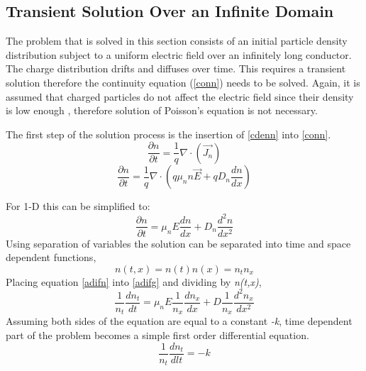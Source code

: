 \begin{doublespace}
\clearpage
\subsection{Transient Solution Over an Infinite Domain}

The problem that is solved in this section consists of an initial particle density distribution subject to a uniform electric field over an infinitely long conductor. The charge distribution drifts and diffuses over time. This requires a transient solution  therefore the continuity equation (\ref{conn}) needs to be solved. Again, it is assumed that charged particles do not affect the electric field since their density is low enough , therefore solution of Poisson's equation is not necessary. 

The first step of the solution process is the insertion of \eqref{cdenn} into \eqref{conn}.
\begin{equation}
\frac{\partial n}{\partial t} = \frac{1}{q}\nabla \cdot (\vec{J_n})
\end{equation}
\begin{equation}
\frac{\partial n}{\partial t} = \frac{1}{q}\nabla \cdot (q \mu_{n} n \vec{E}+qD_{n} \frac{dn}{dx} )
\end{equation}

For 1-D this can be simplified to:
\begin{equation}
\frac{\partial n}{\partial t} = \mu_n E \frac{d n}{d x}+D_{n}\frac{d^{2}n}{dx^{2}}
\label{adifg}
\end{equation}
Using separation of variables the solution can be separated into time and space dependent functions\cite{NumModel},
\begin{equation}
n(t,x)=n(t)n(x)=n_t n_x
\label{adifn}
\end{equation}
Placing equation \eqref{adifn} into \eqref{adifg} and dividing by \textit{n(t,x)},
\begin{equation}
\frac{1}{n_{t}}\frac{d n_{t}}{d t}=\mu_n E \frac{1}{n_{x}}\frac{d n_{x}}{dx}+D\frac{1}{n_{x}}\frac{d^2 n_{x}}{dx^2}
\label{Adif}
\end{equation}
Assuming both sides of the equation are equal to a constant \textit{-k}, time dependent part of the problem becomes a simple first order differential equation.
\begin{equation}
\nonumber
\frac{1}{n_{t}}\frac{d n_{t}}{dl t}=-k
\end{equation}


\end{doublespace}
